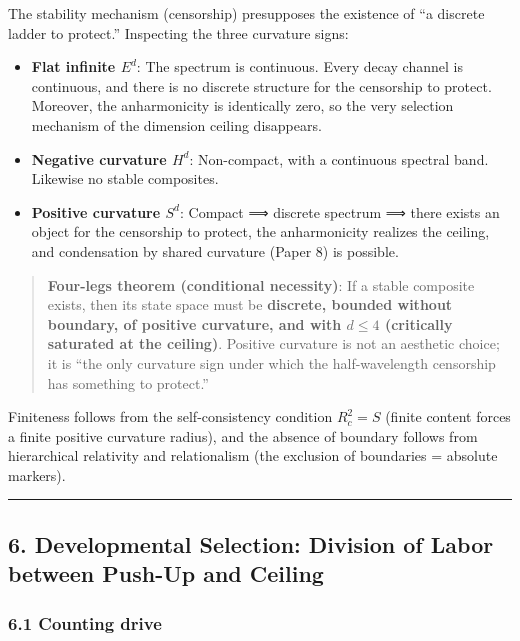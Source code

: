 \documentclass[
]{ltjsarticle}
\providecommand{\tightlist}{%
  \setlength{\itemsep}{0pt}\setlength{\parskip}{0pt}}
\begin{document}
The stability mechanism (censorship) presupposes the existence of ``a
discrete ladder to protect.'' Inspecting the three curvature signs:

\begin{itemize}
\tightlist
\item
  \textbf{Flat infinite \(E^d\)}: The spectrum is continuous. Every
  decay channel is continuous, and there is no discrete structure for
  the censorship to protect. Moreover, the anharmonicity is identically
  zero, so the very selection mechanism of the dimension ceiling
  disappears.
\item
  \textbf{Negative curvature \(H^d\)}: Non-compact, with a continuous
  spectral band. Likewise no stable composites.
\item
  \textbf{Positive curvature \(S^d\)}: Compact ⟹ discrete spectrum ⟹
  there exists an object for the censorship to protect, the
  anharmonicity realizes the ceiling, and condensation by shared
  curvature (Paper 8) is possible.
\end{itemize}

\begin{quote}
\textbf{Four-legs theorem (conditional necessity)}: If a stable
composite exists, then its state space must be \textbf{discrete, bounded
without boundary, of positive curvature, and with \(d\le4\) (critically
saturated at the ceiling)}. Positive curvature is not an aesthetic
choice; it is ``the only curvature sign under which the half-wavelength
censorship has something to protect.''
\end{quote}

Finiteness follows from the self-consistency condition \(R_c^2=S\)
(finite content forces a finite positive curvature radius), and the
absence of boundary follows from hierarchical relativity and
relationalism (the exclusion of boundaries = absolute markers).

\begin{center}\rule{0.5\linewidth}{0.5pt}\end{center}

\subsection{6. Developmental Selection: Division of Labor between
Push-Up and
Ceiling}\label{developmental-selection-division-of-labor-between-push-up-and-ceiling}

\subsubsection{6.1 Counting drive}\label{counting-drive}
\end{document}
